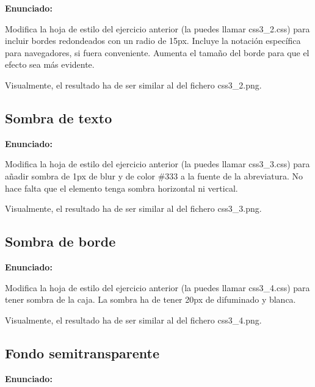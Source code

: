 \textbf{Enunciado:}

Modifica la hoja de estilo del ejercicio anterior (la puedes llamar css3\_2.css)
para incluir bordes redondeados con un radio de 15px. Incluye la notación específica para navegadores, si fuera conveniente. Aumenta el tamaño del borde
para que el efecto sea más evidente.

Visualmente, el resultado ha de ser similar al del fichero css3\_2.png.

\subsection{Sombra de texto}
\label{subsec:sombra-texto}

\textbf{Enunciado:}

Modifica la hoja de estilo del ejercicio anterior (la puedes llamar css3\_3.css) para añadir sombra de 1px de blur y de color \#333 a la fuente de la abreviatura. No hace falta que el elemento tenga sombra horizontal ni vertical.

Visualmente, el resultado ha de ser similar al del fichero css3\_3.png.

\subsection{Sombra de borde}
\label{subsec:sombra-borde}

\textbf{Enunciado:}

Modifica la hoja de estilo del ejercicio anterior (la puedes llamar css3\_4.css) para tener sombra de la caja. La sombra ha de tener 20px de difuminado y blanca.

Visualmente, el resultado ha de ser similar al del fichero css3\_4.png.

\subsection{Fondo semitransparente}
\label{subsec:fondo-semitransparente}

\textbf{Enunciado:}

